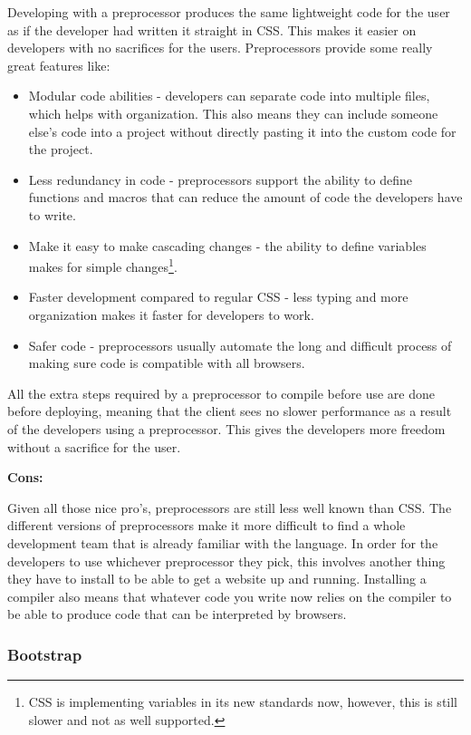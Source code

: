 \documentclass[draftclsnofoot,onecolumn,letterpaper,10pt,compsoc]{IEEEtran}
\begin{document}
    Developing with a preprocessor produces the same lightweight code for the user as if the developer had written it straight in CSS. This makes it easier on developers with no sacrifices for the users. Preprocessors provide some really great features like:
    \begin{itemize}
      \item Modular code abilities - developers can separate code into multiple files, which helps with organization. This also means they can include someone else's code into a project without directly pasting it into the custom code for the project.\cite{sass}
      \item Less redundancy in code - preprocessors support the ability to define functions and macros that can reduce the amount of code the developers have to write.
      \item Make it easy to make cascading changes - the ability to define variables makes for simple changes\footnote{CSS is implementing variables in its new standards now, however, this is still slower and not as well supported.}.
      \item Faster development compared to regular CSS - less typing and more organization makes it faster for developers to work.\cite{sass}
      \item Safer code - preprocessors usually automate the long and difficult process of making sure code is compatible with all browsers.
    \end{itemize}

    All the extra steps required by a preprocessor to compile before use are done before deploying, meaning that the client sees no slower performance as a result of the developers using a preprocessor.
    This gives the developers more freedom without a sacrifice for the user.

    \noindent \textbf{Cons:}

    Given all those nice pro's, preprocessors are still less well known than CSS.
    The different versions of preprocessors make it more difficult to find a whole development team that is already familiar with the language.
    In order for the developers to use whichever preprocessor they pick, this involves another thing they have to install to be able to get a website up and running.
    Installing a compiler also means that whatever code you write now relies on the compiler to be able to produce code that can be interpreted by browsers.


  	\subsubsection{Bootstrap}
\end{document}
